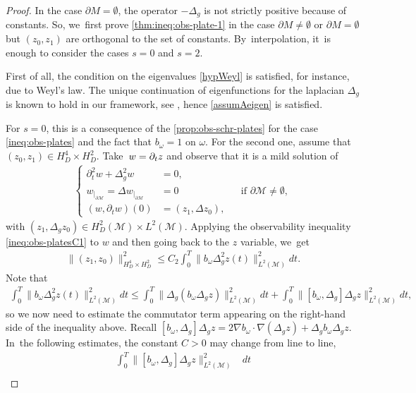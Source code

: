 \documentclass[JEP,XML,SOM,Unicode,published]{cedram}
\theoremstyle{definition}
\let\mc\mathcal
\newcommand{\M}{\mc{M}}
\providecommand{\norm}[1]{\lVert#1\rVert}
\begin{document}
\begin{proof}
In the case $\partial M= \emptyset$, the operator $-\Delta_g$ is not strictly positive because of constants. So, we~first prove \eqref{thm:ineq:obs-plate-1} in the case $\partial M\neq \emptyset$ or $\partial M= \emptyset$ but $(z_0, z_1)$ are orthogonal to the set of constants. By~interpolation, it~is enough to consider the cases $s=0$ and $s=2$.

First of all, the condition on the eigenvalues \eqref{hypWeyl} is satisfied, for instance, due to Weyl's law. The unique continuation of eigenfunctions for the laplacian $\Delta_g$ is known to hold in our framework, see \cite[Prop.\,5.2.]{LLR:book1}, hence \cref{assumAeigen} is satisfied.

For $s=0$, this is a consequence of the \cref{prop:obs-schr-plates} for the case \eqref{ineq:obs-plates} and the fact that $b_{\omega}=1$ on $\omega$. For the second one, assume that $(z_0, z_1)\in H^4_D\times H^2_D$. Take~$w=\nobreak\partial_t z$ and observe that it is a mild solution of
\begin{align*}
\left\{\begin{aligned}
\partial_t^2 w+\Delta_g^2 w&=0, &\\
w_{|_{\partial\M}}=\Delta w_{|_{\partial\M}}&=0 &&\text{if } \partial\M\neq\emptyset,\\
(w, \partial_t w)(0)&=(z_1, \Delta z_0),
\end{aligned}\right.
\end{align*}
with $(z_1, \Delta_g z_0)\in H_D^2(\M)\times L^2(\M)$. Applying the observability inequality \eqref{ineq:obs-platesC1} to $w$ and then going back to the $z$ variable, we~get
\begin{align*}
\norm{(z_1, z_0)}_{H_D^4\times H_D^2}^2\leq C_2\int_0^T \norm{b_\omega \Delta_g^2 z(t)}_{L^2(\M)}^2dt.
\end{align*}
Note that
\begin{align*}
\int_0^T \norm{b_\omega \Delta_g^2 z(t)}_{L^2(\M)}^2dt\leq \int_0^T \norm{\Delta_g(b_\omega\Delta_g z)}_{L^2(\M)}^2dt+\int_0^T \norm{[b_\omega, \Delta_g]\Delta_g z}_{L^2(\M)}^2dt,
\end{align*}
so we now need to estimate the commutator term appearing on the right-hand side of the inequality above. Recall $[b_\omega, \Delta_g]\Delta_g z=2\nabla b_\omega\cdot\nabla(\Delta_g z)+\Delta_g b_\omega\Delta_g z$. In~the following estimates, the constant $C>0$ may change from line to line,
\begin{align*}
\int_0^T \norm{[b_\omega, \Delta_g]\Delta_g z}_{L^2(\M)}^2&dt\\[-8pt]

\end{align*}
\end{proof}
\end{document}
